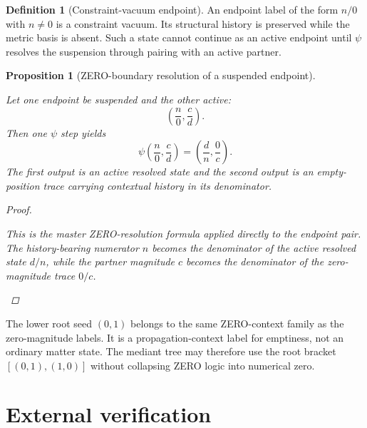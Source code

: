 \documentclass[11pt, letterpaper]{article}
\theoremstyle{definition}
\newtheorem{definition}{Definition}[section]
\theoremstyle{plain}
\newtheorem{proposition}{Proposition}[section]
\begin{document}
\begin{definition}[Constraint-vacuum endpoint]
An endpoint label of the form $n/0$ with $n\neq 0$ is a constraint vacuum.
Its structural history is preserved while the metric basis is absent.  Such a
state cannot continue as an active endpoint until $\psi$ resolves the
suspension through pairing with an active partner.
\end{definition}

\begin{proposition}[ZERO-boundary resolution of a suspended endpoint]
\begin{rsbox}
Let one endpoint be suspended and the other active:
\[
\left(\frac{n}{0},\frac{c}{d}\right).
\]
Then one $\psi$ step yields
\[
\psi\!\left(\frac{n}{0},\frac{c}{d}\right)
=
\left(\frac{d}{n},\frac{0}{c}\right).
\]
The first output is an active resolved state and the second output is an
empty-position trace carrying contextual history in its denominator.
\end{rsbox}
\begin{proof}
\begin{rsbox}
This is the master ZERO-resolution formula applied directly to the endpoint
pair.  The history-bearing numerator $n$ becomes the denominator of the active
resolved state $d/n$, while the partner magnitude $c$ becomes the denominator of
the zero-magnitude trace $0/c$.
\end{rsbox}
\end{proof}

\end{proposition}

\begin{observebox}
The lower root seed $(0,1)$ belongs to the same ZERO-context family as the
zero-magnitude labels.  It is a propagation-context label for emptiness, not an
ordinary matter state.  The mediant tree may therefore use the root bracket
$[(0,1),(1,0)]$ without collapsing ZERO logic into numerical zero.
\end{observebox}

\section{External verification}
\end{document}
